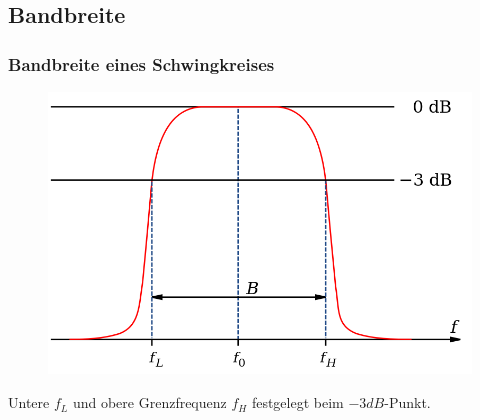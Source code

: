 
\subsection*{Bandbreite}
\begin{frame}
  \frametitle{Bandbreite eines Schwingkreises}
  \begin{center}
    \begin{figure}
      \includegraphics[width=\textwidth,height=.6\textheight,keepaspectratio]{a04/bandwidth.png}
    \end{figure}
  \end{center}
  Untere $f_L$ und obere Grenzfrequenz $f_H$ festgelegt beim $-3dB$-Punkt.
\end{frame}

